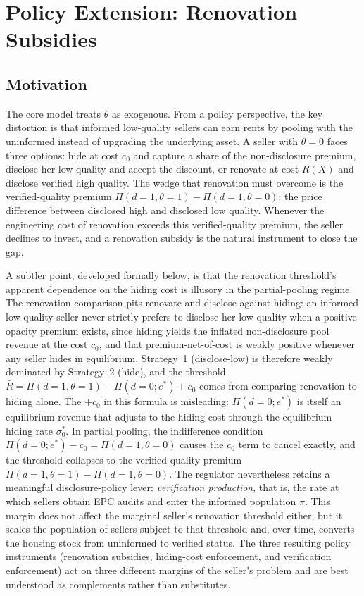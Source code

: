 \documentclass[10pt,letterpaper]{bp-template-concise}
\begin{document}
\section{Policy Extension: Renovation Subsidies}
\label{sec:policy}

\subsection{Motivation}

The core model treats $\theta$ as exogenous. From a policy perspective, the key distortion is that informed low-quality sellers can earn rents by pooling with the uninformed instead of upgrading the underlying asset. A seller with $\theta=0$ faces three options: hide at cost $c_0$ and capture a share of the non-disclosure premium, disclose her low quality and accept the discount, or renovate at cost $R(X)$ and disclose verified high quality. The wedge that renovation must overcome is the verified-quality premium $\Pi(d{=}1,\theta{=}1) - \Pi(d{=}1,\theta{=}0)$: the price difference between disclosed high and disclosed low quality. Whenever the engineering cost of renovation exceeds this verified-quality premium, the seller declines to invest, and a renovation subsidy is the natural instrument to close the gap.

A subtler point, developed formally below, is that the renovation threshold's apparent dependence on the hiding cost is illusory in the partial-pooling regime. The renovation comparison pits renovate-and-disclose against hiding: an informed low-quality seller never strictly prefers to disclose her low quality when a positive opacity premium exists, since hiding yields the inflated non-disclosure pool revenue at the cost $c_0$, and that premium-net-of-cost is weakly positive whenever any seller hides in equilibrium. Strategy~1 (disclose-low) is therefore weakly dominated by Strategy~2 (hide), and the threshold $\bar R = \Pi(d{=}1,\theta{=}1) - \Pi(d{=}0;e^*) + c_0$ comes from comparing renovation to hiding alone. The $+c_0$ in this formula is misleading: $\Pi(d{=}0;e^*)$ is itself an equilibrium revenue that adjusts to the hiding cost through the equilibrium hiding rate $\sigma_0^*$. In partial pooling, the indifference condition $\Pi(d{=}0;e^*) - c_0 = \Pi(d{=}1,\theta{=}0)$ causes the $c_0$ term to cancel exactly, and the threshold collapses to the verified-quality premium $\Pi(d{=}1,\theta{=}1)-\Pi(d{=}1,\theta{=}0)$. The regulator nevertheless retains a meaningful disclosure-policy lever: \emph{verification production}, that is, the rate at which sellers obtain EPC audits and enter the informed population $\pi$. This margin does not affect the marginal seller's renovation threshold either, but it scales the population of sellers subject to that threshold and, over time, converts the housing stock from uninformed to verified status. The three resulting policy instruments (renovation subsidies, hiding-cost enforcement, and verification enforcement) act on three different margins of the seller's problem and are best understood as complements rather than substitutes.
\end{document}
